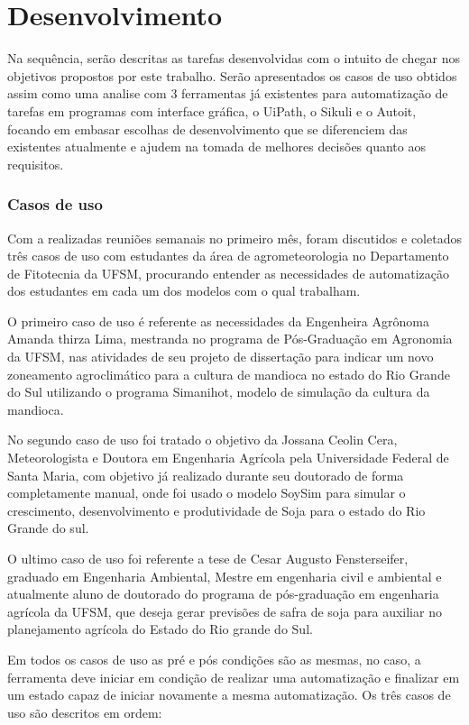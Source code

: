 \documentclass[tg]{mdtufsm}
\begin{document}
	\chapter{Desenvolvimento}

	Na sequência, serão descritas as tarefas desenvolvidas com o intuito de chegar nos objetivos propostos por este trabalho. Serão apresentados os casos de uso obtidos assim como uma analise com 3 ferramentas já existentes para automatização de tarefas em programas com interface gráfica, o UiPath, o Sikuli e o Autoit, focando em embasar escolhas de desenvolvimento que se diferenciem das existentes atualmente e ajudem na tomada de melhores decisões quanto aos requisitos.

	\subsection {Casos de uso}

	Com a realizadas reuniões semanais no primeiro mês, foram discutidos e coletados três casos de uso com estudantes da área de agrometeorologia no Departamento de Fitotecnia da UFSM, procurando entender as necessidades de automatização dos estudantes em cada um dos modelos com o qual trabalham.

	O primeiro caso de uso é referente as necessidades da Engenheira Agrônoma Amanda thirza Lima, mestranda no programa de Pós-Graduação em Agronomia da UFSM, nas atividades de seu projeto de dissertação para indicar um novo zoneamento agroclimático para a cultura de mandioca no estado do Rio Grande do Sul utilizando o programa Simanihot, modelo de simulação da cultura da mandioca.

	No segundo caso de uso foi tratado o objetivo da Jossana Ceolin Cera, Meteorologista e Doutora em Engenharia Agrícola pela Universidade Federal de Santa Maria, com objetivo já realizado durante seu doutorado de forma completamente manual, onde foi usado o modelo SoySim para simular o crescimento, desenvolvimento e produtividade de Soja para o estado do Rio Grande do sul.

	O ultimo caso de uso foi referente a tese de Cesar Augusto Fensterseifer, graduado em Engenharia Ambiental, Mestre em engenharia civil e ambiental e atualmente aluno de doutorado do programa de pós-graduação em engenharia agrícola da UFSM, que deseja gerar previsões de safra de soja para auxiliar no planejamento agrícola do Estado do Rio grande do Sul.

	Em todos os casos de uso as pré e pós condições são as mesmas, no caso, a ferramenta deve iniciar em condição de realizar uma automatização e finalizar em um estado capaz de iniciar novamente a mesma automatização. Os três casos de uso são descritos em ordem:
	\bigskip \bigskip \bigskip \bigskip
\end{document}
